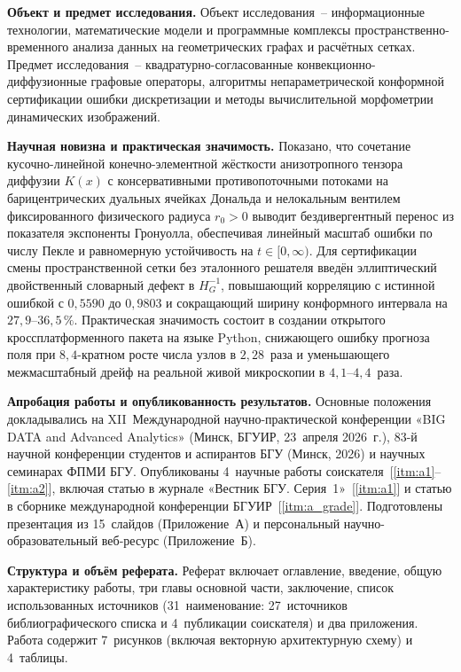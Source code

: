 \textbf{Объект и предмет исследования.} Объект исследования~-- информационные технологии, математические модели и программные комплексы пространственно-временного анализа данных на геометрических графах и расчётных сетках. Предмет исследования~-- квадратурно-согласованные конвекционно-диффузионные графовые операторы, алгоритмы непараметрической конформной сертификации ошибки дискретизации и методы вычислительной морфометрии динамических изображений.

\textbf{Научная новизна и практическая значимость.} Показано, что сочетание кусочно-линейной конечно-элементной жёсткости анизотропного тензора диффузии $K(x)$ с консервативными противопоточными потоками на барицентрических дуальных ячейках Дональда и нелокальным вентилем фиксированного физического радиуса $r_0>0$ выводит бездивергентный перенос из показателя экспоненты Гронуолла, обеспечивая линейный масштаб ошибки по числу Пекле и равномерную устойчивость на $t\in[0,\infty)$. Для сертификации смены пространственной сетки без эталонного решателя введён эллиптический двойственный словарный дефект в $H_G^{-1}$, повышающий корреляцию с истинной ошибкой с $0{,}5590$ до $0{,}9803$ и сокращающий ширину конформного интервала на $27{,}9\text{--}36{,}5\,\%$. Практическая значимость состоит в создании открытого кроссплатформенного пакета на языке Python, снижающего ошибку прогноза поля при $8{,}4$-кратном росте числа узлов в $2{,}28$~раза и уменьшающего межмасштабный дрейф на реальной живой микроскопии в $4{,}1\text{--}4{,}4$~раза.

\textbf{Апробация работы и опубликованность результатов.} Основные положения докладывались на XII~Международной научно-практической конференции «BIG DATA and Advanced Analytics» (Минск, БГУИР, 23~апреля 2026~г.), 83-й научной конференции студентов и аспирантов БГУ (Минск, 2026) и научных семинарах ФПМИ БГУ. Опубликованы 4~научные работы соискателя~[\ref{itm:a1}--\ref{itm:a2}], включая статью в журнале «Вестник БГУ. Серия~1»~[\ref{itm:a1}] и статью в сборнике международной конференции БГУИР~[\ref{itm:a_grade}]. Подготовлены презентация из 15~слайдов (Приложение~А) и персональный научно-образовательный веб-ресурс (Приложение~Б).

\textbf{Структура и объём реферата.} Реферат включает оглавление, введение, общую характеристику работы, три главы основной части, заключение, список использованных источников (31~наименование: 27~источников библиографического списка и 4~публикации соискателя) и два приложения. Работа содержит 7~рисунков (включая векторную архитектурную схему) и 4~таблицы.

\newpage
